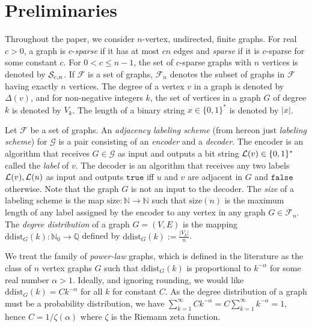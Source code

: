 
\section{Preliminaries}
Throughout the paper, we consider $n$-vertex, undirected, finite graphs.
For real $c > 0$, a graph is $c$-\emph{sparse} if it has at most $cn$ edges and \emph{sparse} if it is $c$-sparse for some constant $c$. For $0 < c \leq n-1$, the set of $c$-sparse graphs with $n$ vertices is denoted by $ \mathcal{S}_{c,n}$.
If $\mathcal{F}$ is a set of graphs,  $\mathcal{F}_n$ denotes the subset of graphs in $\mathcal{F}$ having exactly $n$
vertices. The degree of a vertex $v$ in a graph is denoted by $\Delta(v)$, and for non-negative integers $k$,
the set of vertices in a graph $G$ of degree $k$  is denoted by $V_k$.
The length of a binary string $x \in \{ 0,1 \}^*$ is denoted by $\vert x \vert$.

Let  $\mathcal{F}$ be a set of graphs. An  \emph{adjacency labeling scheme} (from hereon just \emph{labeling scheme}) for  $\mathcal{G}$
is a pair consisting of an \emph{encoder} and a \emph{decoder}. The encoder is an algorithm that receives $G \in \mathcal{G}$ as input and outputs a bit string $ \mathcal{L}(v) \in \{0,1\}^*$ called the \emph{label} of $v$. The decoder 
is an algorithm that receives any two labels $ \mathcal{L}(v), \mathcal{L}(u)$ as input and outputs $\mathtt{true}$ if{f} $u$ and $v$
are adjacent in $G$ and $\mathtt{false}$ otherwise. Note that the graph $G$ is not an input to the decoder.
The \emph{size} of a labeling scheme is the map $\textrm{size} : \mathbb{N} \longrightarrow \mathbb{N}$
such that $\textrm{size}(n)$ is the maximum length of any label assigned by the encoder to any vertex in
any graph $G \in \mathcal{F}_n$. The \emph{degree distribution} of a graph $G = (V,E)$ is the mapping
 $\mathrm{ddist}_G (k) : \mathbb{N}_0 \longrightarrow \mathbb{Q}$
defined by $\mathrm{ddist}_G (k) := \frac{\vert V_k \vert} {n}$.

We treat the family of \emph{power-law} graphs, which is defined in the literature as the class of $n$ vertex graphs $G$ such that $\mathrm{ddist}_G(k)$
is proportional to $k^{-\alpha}$ for some real number $\alpha > 1$. Ideally, and ignoring rounding, we would like $\mathrm{ddist}_G(k) = Ck^{-\alpha}$ for all $k$ for constant $C$. As the degree distribution of a graph must be a probability distribution, we have $\sum_{k=1}^\infty C k^{-\alpha} = C \sum_{k=1}^\infty k^{-\alpha} = 1$, hence  $C = 1/\zeta(\alpha)$ where $\zeta$ is the Riemann zeta function. 



